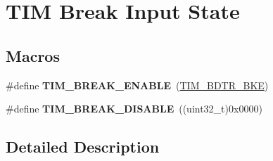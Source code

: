 \hypertarget{group___t_i_m___break___input__enable__disable}{}\section{T\+IM Break Input State}
\label{group___t_i_m___break___input__enable__disable}
\subsection*{Macros}
\begin{DoxyCompactItemize}
\item 
\#define {\bfseries T\+I\+M\+\_\+\+B\+R\+E\+A\+K\+\_\+\+E\+N\+A\+B\+LE}~(\hyperlink{group___peripheral___registers___bits___definition_ga74250b040dd9fd9c09dcc54cdd6d86d8}{T\+I\+M\+\_\+\+B\+D\+T\+R\+\_\+\+B\+KE})\hypertarget{group___t_i_m___break___input__enable__disable_ga3f966247b03532b8d93f9bddc032d863}{}\label{group___t_i_m___break___input__enable__disable_ga3f966247b03532b8d93f9bddc032d863}

\item 
\#define {\bfseries T\+I\+M\+\_\+\+B\+R\+E\+A\+K\+\_\+\+D\+I\+S\+A\+B\+LE}~((uint32\+\_\+t)0x0000)\hypertarget{group___t_i_m___break___input__enable__disable_ga8b34ce60f3f08c4b0d924a6546939994}{}\label{group___t_i_m___break___input__enable__disable_ga8b34ce60f3f08c4b0d924a6546939994}

\end{DoxyCompactItemize}


\subsection{Detailed Description}
